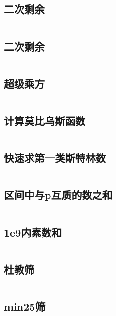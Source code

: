 \inputminted{cpp}{code/Stern-BrocotTree.cc}

\subsection{二次剩余} 

\inputminted{cpp}{code/QuadraticResidue.cc}

\subsection{二次剩余} 

\inputminted{cpp}{code/二次剩余.cc}

\subsection{超级乘方} 

\inputminted{cpp}{code/超级乘方.cc}

\subsection{计算莫比乌斯函数} 

\inputminted{cpp}{code/mobius.cc}

\subsection{	快速求第一类斯特林数} 

\inputminted{cpp}{code/快速求第一类斯特林数.cc}

\subsection{区间中与p互质的数之和} 

\inputminted{cpp}{code/区间中与p互质的数之和.cc}

\subsection{1e9内素数和} 

\inputminted{cpp}{code/1e9内素数和.cc}

\subsection{杜教筛} 

\inputminted{cpp}{code/Dujiao.cc}

\subsection{min25筛} 

